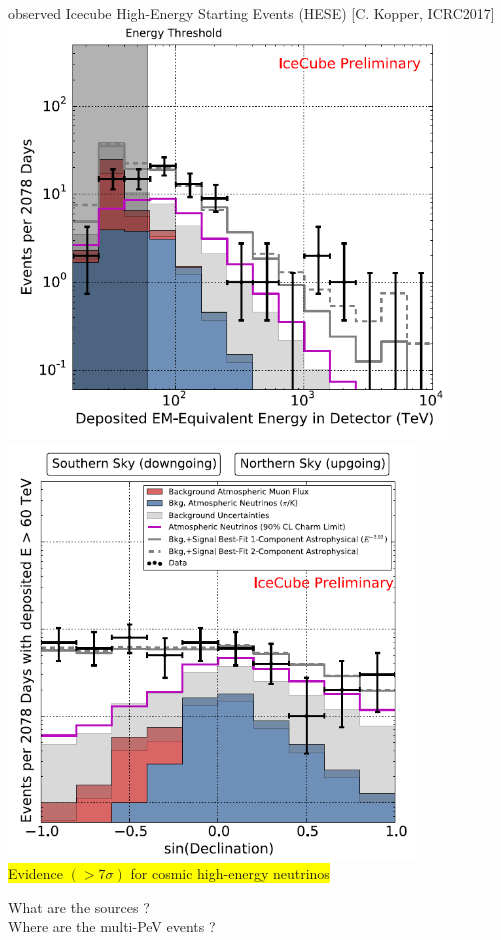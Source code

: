 \Tr
\onecolumn
\begin{center}
{ observed Icecube High-Energy Starting Events (HESE)} {\large [C. Kopper, ICRC2017]}
\includegraphics[keepaspectratio,height=11cm]{hese-e-6yr}
\includegraphics[keepaspectratio,height=11cm]{hese-decl-6yr}\\
\colorbox{yellow}{Evidence $(>7\sigma)$ for cosmic high-energy neutrinos}
\end{center}
What are the sources ?\\
Where are the multi-PeV events ?


